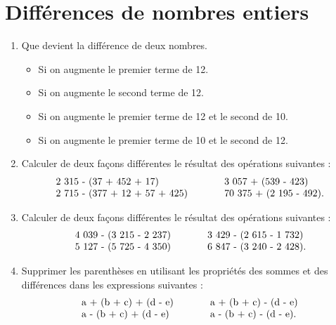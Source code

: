  
 \chapter{Différences de nombres entiers}
 \begin{enumerate}
 \item Que devient la différence de deux nombres.\begin{itemize}
 \item Si on augmente le premier terme de 12.
 \item Si on augmente le second terme de 12. 
 \item Si on augmente le premier terme de 12 et le second de 10. 
 \item Si on augmente le premier terme de 10 et le second de 12.
 \end{itemize}
 
 \item Calculer de deux façons différentes le résultat des opérations suivantes : 
 \[
 \begin{tabular}{l c l }
 2~315 - (37 + 452 + 17) & \ \ \ \ \ & 3~057 + (539 - 423) \\
 2~715 - (377 + 12 + 57 + 425) & \ \ \ \ \ & 70~375 + (2~195 - 492).
  \end{tabular}
 \]
 
  \item Calculer de deux façons différentes le résultat des opérations suivantes : 
 \[
 \begin{tabular}{l c l }
 4~039 - (3~215 - 2~237) & \ \ \ \ \ & 3~429 - (2~615 - 1~732) \\
 5~127 - (5~725 - 4~350) & \ \ \ \ \ & 6~847 - (3~240 - 2~428).
  \end{tabular}
 \]
 
 \item Supprimer les parenthèses en utilisant les propriétés des sommes et
 des différences dans les expressions suivantes : 
  \[
 \begin{tabular}{l c l }
 a + (b + c) + (d - e) & \ \ \ \ \ & a + (b + c) - (d - e) \\
 a - (b + c) + (d - e) & \ \ \ \ \ & a - (b + c) - (d - e).
  \end{tabular}
 \]
 

\end{enumerate}
